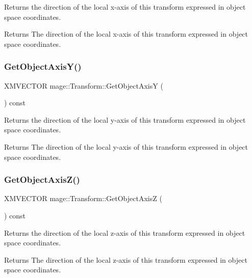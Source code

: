 Returns the direction of the local x-\/axis of this transform expressed in object space coordinates.

\begin{DoxyReturn}{Returns}
The direction of the local x-\/axis of this transform expressed in object space coordinates. 
\end{DoxyReturn}
\hypertarget{structmage_1_1_transform_a1d2b560af18a18246186cdb8477e9019}{}\label{structmage_1_1_transform_a1d2b560af18a18246186cdb8477e9019} 
\subsubsection{\texorpdfstring{Get\+Object\+Axis\+Y()}{GetObjectAxisY()}}
{\footnotesize\ttfamily X\+M\+V\+E\+C\+T\+OR mage\+::\+Transform\+::\+Get\+Object\+AxisY (\begin{DoxyParamCaption}{ }\end{DoxyParamCaption}) const}

Returns the direction of the local y-\/axis of this transform expressed in object space coordinates.

\begin{DoxyReturn}{Returns}
The direction of the local y-\/axis of this transform expressed in object space coordinates. 
\end{DoxyReturn}
\hypertarget{structmage_1_1_transform_af6bf20352279957fdba5041074bdf9c2}{}\label{structmage_1_1_transform_af6bf20352279957fdba5041074bdf9c2} 
\subsubsection{\texorpdfstring{Get\+Object\+Axis\+Z()}{GetObjectAxisZ()}}
{\footnotesize\ttfamily X\+M\+V\+E\+C\+T\+OR mage\+::\+Transform\+::\+Get\+Object\+AxisZ (\begin{DoxyParamCaption}{ }\end{DoxyParamCaption}) const}

Returns the direction of the local z-\/axis of this transform expressed in object space coordinates.

\begin{DoxyReturn}{Returns}
The direction of the local z-\/axis of this transform expressed in object space coordinates. 
\end{DoxyReturn}
\hypertarget{structmage_1_1_transform_a6c14d929c23c6b6e065e7f9b0ed919ea}{}\label{structmage_1_1_transform_a6c14d929c23c6b6e065e7f9b0ed919ea} 
